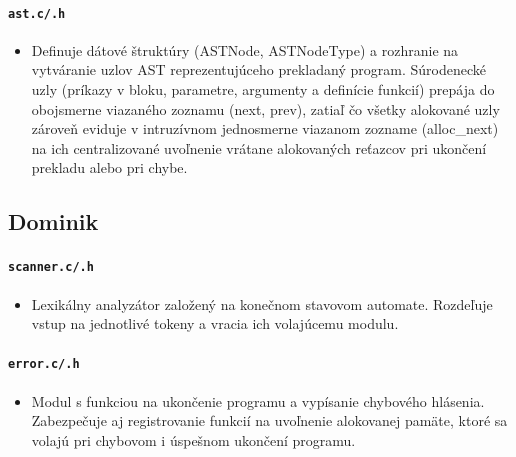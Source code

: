 \paragraph{\texttt{ast.c/.h}}
\begin{itemize}
    \item Definuje dátové štruktúry (ASTNode, ASTNodeType) a rozhranie na vytváranie uzlov AST reprezentujúceho prekladaný program. Súrodenecké uzly (príkazy v bloku, parametre, argumenty a definície funkcií) prepája do obojsmerne viazaného zoznamu (next, prev), zatiaľ čo všetky alokované uzly zároveň eviduje v intruzívnom jednosmerne viazanom zozname (alloc\_next) na ich centralizované uvoľnenie vrátane alokovaných reťazcov pri ukončení prekladu alebo pri chybe.
\end{itemize}

\subsection{Dominik}

\paragraph{\texttt{scanner.c/.h}}
\begin{itemize}
    \item Lexikálny analyzátor založený na konečnom stavovom automate. Rozdeľuje vstup na jednotlivé tokeny a vracia ich volajúcemu modulu.
\end{itemize}

\paragraph{\texttt{error.c/.h}}
\begin{itemize}
    \item Modul s funkciou na ukončenie programu a vypísanie chybového hlásenia. Zabezpečuje aj registrovanie funkcií na uvoľnenie alokovanej pamäte, ktoré sa volajú pri chybovom i úspešnom ukončení programu.
\end{itemize}

\newpage